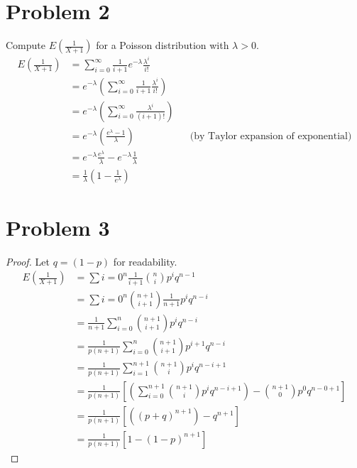 \documentclass{article}
\begin{document}
\section*{Problem 2}
    Compute $E(\frac{1}{X+1})$ for a Poisson distribution with $\lambda > 0$.
    \begin{align*}
        E\left(\frac{1}{X+1}\right) &= \sum_{i=0}^\infty\frac{1}{i+1}e^{-\lambda}\frac{\lambda^i}{i!}\\
        &=e^{-\lambda}\left(\sum_{i=0}^\infty\frac{1}{i+1}\frac{\lambda^i}{i!}\right)\\
        &=e^{-\lambda}\left(\sum_{i=0}^\infty\frac{\lambda^i}{(i+1)!}\right)\\
        &=e^{-\lambda}\left(\frac{e^\lambda-1}{\lambda}\right) && \text{(by Taylor expansion of exponential)}\\
        &=e^{-\lambda}\frac{e^\lambda}{\lambda} - e^{-\lambda}\frac{1}{\lambda}\\
        &=\frac{1}{\lambda}(1-\frac{1}{e^\lambda})
    \end{align*}
\section*{Problem 3}
    \begin{proof}
        Let $q = (1 - p)$ for readability.
        \begin{align*}
            E(\frac{1}{X+1})&=\sum{i=0}^n\frac{1}{i+1}{n \choose i}p^iq^{n-1}\\
            &=\sum{i=0}^n{n+1 \choose i+1} \frac{1}{n+1}p^iq^{n-i}\\
            &=\frac{1}{n+1}\sum_{i=0}^n{n+1\choose i+1}p^iq^{n-i}\\
            &=\frac{1}{p(n+1)}\sum_{i=0}^n{n+1\choose i+1}p^{i+1}q^{n-i}\\
            &=\frac{1}{p(n+1)}\sum_{i=1}^{n+1}{n+1\choose i}p^iq^{n-i+1}\\
            &=\frac{1}{p(n+1)}\left[\left(\sum_{i=0}^{n+1}{n+1\choose i}p^iq^{n-i+1}\right)-{n+1 \choose 0}p^0q^{n-0+1}\right]\\
            &=\frac{1}{p(n+1)}\left[\left((p+q)^{n+1}\right)-q^{n+1}\right]\\
            &=\frac{1}{p(n+1)}\left[1-(1-p)^{n+1}\right]
        \end{align*} 
    \end{proof}
\end{document}
